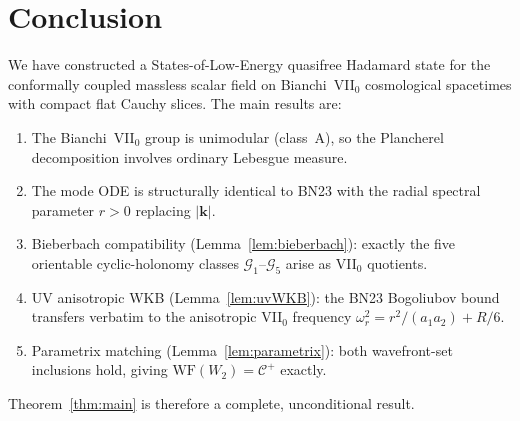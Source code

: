 \documentclass[12pt, a4paper]{article}
\theoremstyle{remark}
\newcommand{\WF}{\mathrm{WF}}
\begin{document}
\section{Conclusion}

We have constructed a States-of-Low-Energy quasifree Hadamard state for
the conformally coupled massless scalar field on Bianchi~VII$_0$
cosmological spacetimes with compact flat Cauchy slices.  The main
results are:
\begin{enumerate}
\item The Bianchi~VII$_0$ group is unimodular (class~A), so the
  Plancherel decomposition involves ordinary Lebesgue measure.
\item The mode ODE is structurally identical to BN23 with the radial
  spectral parameter $r > 0$ replacing $|\mathbf{k}|$.
\item Bieberbach compatibility (Lemma~\ref{lem:bieberbach}): exactly the
  five orientable cyclic-holonomy classes $\mathcal{G}_1$--$\mathcal{G}_5$
  arise as VII$_0$ quotients.
\item UV anisotropic WKB (Lemma~\ref{lem:uvWKB}): the BN23 Bogoliubov
  bound transfers verbatim to the anisotropic VII$_0$ frequency
  $\omega_r^2 = r^2/(a_1 a_2) + R/6$.
\item Parametrix matching (Lemma~\ref{lem:parametrix}): both wavefront-set
  inclusions hold, giving $\WF(W_2) = \mathcal{C}^+$ exactly.
\end{enumerate}
Theorem~\ref{thm:main} is therefore a complete, unconditional result.
\end{document}
